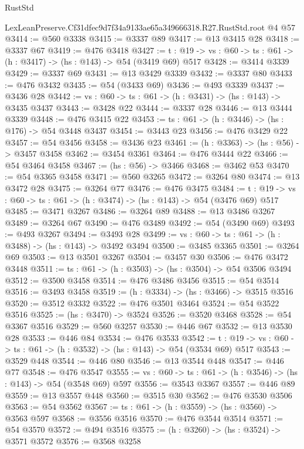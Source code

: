 \begin{lexlean}{RustStd}
\begin{coremodule}
  LexLeanPreserve.Cf31dfec9d7f34a9133ae65a349666318.R27.RustStd.root @4 @57
@3414 := @560 @3338
@3415 := @3337 @89
@3417 := @13 @3415 @28
@3418 := @3337 @67
@3419 := @476 @3418
@3427 := {t : @19} -> {vs : @60} -> {ts : @61} -> (h : @3417) -> (hs : @143) -> @54 (@3419 @69) @517
@3428 := @3414 @3339
@3429 := @3337 @69
@3431 := @13 @3429 @3339
@3432 := @3337 @80
@3433 := @476 @3432
@3435 := @54 (@3433 @69)
@3436 := @493 @3339
@3437 := @3436 @28
@3442 := {vs : @60} -> {ts : @61} -> (h : @3431) -> (hs : @143) -> @3435 @3437
@3443 := @3428 @22
@3444 := @3337 @28
@3446 := @13 @3444 @3339
@3448 := @476 @3415 @22
@3453 := {ts : @61} -> (h : @3446) -> (hs : @176) -> @54 @3448 @3437
@3454 := @3443 @23
@3456 := @476 @3429 @22
@3457 := @54 @3456
@3458 := @3436 @23
@3461 := (h : @3363) -> (hs : @56) -> @3457 @3458
@3462 := @3454 @3361
@3464 := @476 @3444 @22
@3466 := @54 @3464 @3458
@3467 := (hs : @56) -> @3466
@3468 := @3462 @53
@3470 := @54 @3365 @3458
@3471 := @560 @3265
@3472 := @3264 @80
@3474 := @13 @3472 @28
@3475 := @3264 @77
@3476 := @476 @3475
@3484 := {t : @19} -> {vs : @60} -> {ts : @61} -> (h : @3474) -> (hs : @143) -> @54 (@3476 @69) @517
@3485 := @3471 @3267
@3486 := @3264 @89
@3488 := @13 @3486 @3267
@3489 := @3264 @67
@3490 := @476 @3489
@3492 := @54 (@3490 @69)
@3493 := @493 @3267
@3494 := @3493 @28
@3499 := {vs : @60} -> {ts : @61} -> (h : @3488) -> (hs : @143) -> @3492 @3494
@3500 := @3485 @3365
@3501 := @3264 @69
@3503 := @13 @3501 @3267
@3504 := @3457 @30
@3506 := @476 @3472 @3448
@3511 := {ts : @61} -> (h : @3503) -> (hs : @3504) -> @54 @3506 @3494
@3512 := @3500 @3458
@3514 := @476 @3486 @3456
@3515 := @54 @3514
@3516 := @3493 @3458
@3519 := (h : @3334) -> (hs : @3466) -> @3515 @3516
@3520 := @3512 @3332
@3522 := @476 @3501 @3464
@3524 := @54 @3522 @3516
@3525 := (hs : @3470) -> @3524
@3526 := @3520 @3468
@3528 := @54 @3367 @3516
@3529 := @560 @3257
@3530 := @446 @67
@3532 := @13 @3530 @28
@3533 := @446 @84
@3534 := @476 @3533
@3542 := {t : @19} -> {vs : @60} -> {ts : @61} -> (h : @3532) -> (hs : @143) -> @54 (@3534 @69) @517
@3543 := @3529 @448
@3544 := @446 @80
@3546 := @13 @3544 @448
@3547 := @446 @77
@3548 := @476 @3547
@3555 := {vs : @60} -> {ts : @61} -> (h : @3546) -> (hs : @143) -> @54 (@3548 @69) @597
@3556 := @3543 @3367
@3557 := @446 @89
@3559 := @13 @3557 @448
@3560 := @3515 @30
@3562 := @476 @3530 @3506
@3563 := @54 @3562
@3567 := {ts : @61} -> (h : @3559) -> (hs : @3560) -> @3563 @597
@3568 := @3556 @3516
@3570 := @476 @3544 @3514
@3571 := @54 @3570
@3572 := @494 @3516
@3575 := (h : @3260) -> (hs : @3524) -> @3571 @3572
@3576 := @3568 @3258

\end{coremodule}
\end{lexlean}
